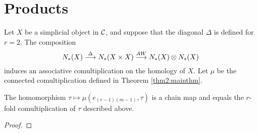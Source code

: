 
\section{Products} \label{s:8products}
Let $X$ be a simplicial object in $\mathcal{C}$, and suppose that the diagonal $\Delta$ is defined for $r=2$. The composition
\[
    N_*(X)\overset{\Delta}{\longrightarrow} N_*(X\times X) \overset{AW}{\longrightarrow} N_*(X)\otimes N_*(X)
\]
induces an associative comultiplication on the homology of $X$. Let $\mu$ be the connected comultiplication defined in Theorem \ref{thm2:mainthm}.
\begin{theorem}
    The homomorphism $\tau\mapsto \mu(e_{(r-1)(m-1)},\tau)$ is a chain map and equals the $r$-fold comultiplication of $\tau$ described above.
\end{theorem}
\begin{proof}
\end{proof}
